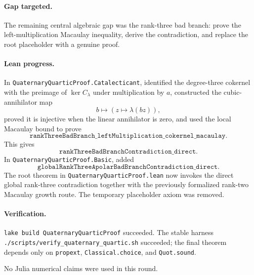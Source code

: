 \documentclass[11pt]{article}
\begin{document}
\paragraph{Gap targeted.}
The remaining central algebraic gap was the rank-three bad branch: prove the
left-multiplication Macaulay inequality, derive the contradiction, and replace
the root placeholder with a genuine proof.

\paragraph{Lean progress.}
In \texttt{QuaternaryQuarticProof.Catalecticant}, identified the
degree-three cokernel with the preimage of \(\ker C_\lambda\) under
multiplication by \(a\), constructed the cubic-annihilator map
\[
b \mapsto (z \mapsto \lambda(bz)),
\]
proved it is injective when the linear annihilator is zero, and used the local
Macaulay bound to prove
\[
\texttt{rankThreeBadBranch\_leftMultiplication\_cokernel\_macaulay}.
\]
This gives
\[
\texttt{rankThreeBadBranchContradiction\_direct}.
\]
In \texttt{QuaternaryQuarticProof.Basic}, added
\[
\texttt{globalRankThreeApolarBadBranchContradiction\_direct}.
\]
The root theorem in \texttt{QuaternaryQuarticProof.lean} now invokes the
direct global rank-three contradiction together with the previously formalized
rank-two Macaulay growth route.  The temporary placeholder axiom was removed.

\paragraph{Verification.}
\texttt{lake build QuaternaryQuarticProof} succeeded.  The stable harness
\texttt{./scripts/verify\_quaternary\_quartic.sh} succeeded; the final theorem
depends only on \texttt{propext}, \texttt{Classical.choice}, and
\texttt{Quot.sound}.

No Julia numerical claims were used in this round.
\end{document}
